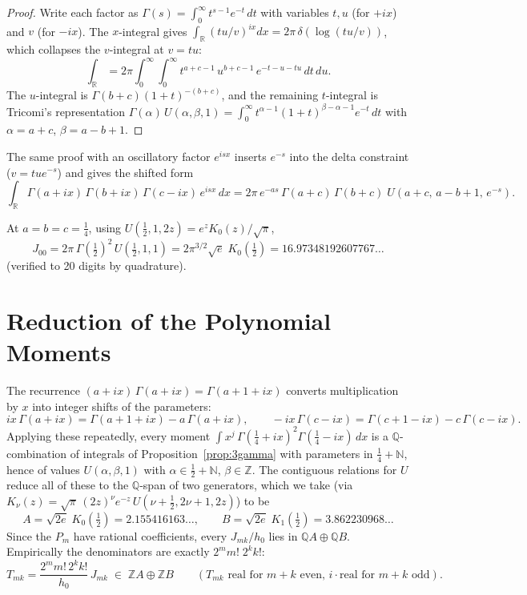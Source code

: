 \documentclass[11pt,a4paper]{article}
\newcommand{\R}{\mathbb{R}}
\newcommand{\Z}{\mathbb{Z}}
\newcommand{\Q}{\mathbb{Q}}
\begin{document}
\begin{proof}
Write each factor as $\Gamma(s) = \int_0^\infty t^{s-1} e^{-t}\, dt$
with variables $t, u$ (for $+ix$) and $v$ (for $-ix$). The $x$-integral
gives $\int_\R (tu/v)^{ix} dx = 2\pi\,\delta(\log(tu/v))$, which
collapses the $v$-integral at $v = tu$:
\[
  \int_\R
  = 2\pi \int_0^\infty\!\!\int_0^\infty
    t^{a+c-1}\, u^{b+c-1}\, e^{-t-u-tu}\, dt\, du.
\]
The $u$-integral is $\Gamma(b+c)(1+t)^{-(b+c)}$, and the remaining
$t$-integral is Tricomi's representation
$\Gamma(\alpha)\, U(\alpha, \beta, 1)
= \int_0^\infty t^{\alpha-1}(1+t)^{\beta-\alpha-1} e^{-t}\, dt$
with $\alpha = a+c$, $\beta = a-b+1$.
\end{proof}

The same proof with an oscillatory factor $e^{isx}$ inserts $e^{-s}$
into the delta constraint ($v = tu e^{-s}$) and gives the shifted form
\begin{equation}\label{eq:shifted}
  \int_\R \Gamma(a+ix)\,\Gamma(b+ix)\,\Gamma(c-ix)\, e^{isx}\, dx
  = 2\pi\, e^{-as}\, \Gamma(a+c)\,\Gamma(b+c)\;
    U(a+c,\, a-b+1,\, e^{-s}).
\end{equation}

At $a = b = c = \tfrac14$, using
$U(\tfrac12, 1, 2z) = e^{z} K_0(z)/\sqrt{\pi}$,
\begin{equation}\label{eq:base}
  J_{00} = 2\pi\, \Gamma(\tfrac12)^2\, U(\tfrac12, 1, 1)
  = 2\pi^{3/2} \sqrt{e}\; K_0(\tfrac12)
  = 16.97348192607767\ldots
\end{equation}
(verified to 20 digits by quadrature).

\section{Reduction of the Polynomial Moments}

The recurrence $(a+ix)\,\Gamma(a+ix) = \Gamma(a+1+ix)$ converts
multiplication by $x$ into integer shifts of the parameters:
\[
  ix\,\Gamma(a+ix) = \Gamma(a+1+ix) - a\,\Gamma(a+ix),
  \qquad
  -ix\,\Gamma(c-ix) = \Gamma(c+1-ix) - c\,\Gamma(c-ix).
\]
Applying these repeatedly, every moment
$\int x^j\, \Gamma(\tfrac14+ix)^2 \Gamma(\tfrac14-ix)\, dx$ is a
$\Q$-combination of integrals of Proposition~\ref{prop:3gamma} with parameters in
$\tfrac14 + \mathbb{N}$, hence of values $U(\alpha, \beta, 1)$ with
$\alpha \in \tfrac12 + \mathbb{N}$, $\beta \in \Z$. The contiguous
relations for $U$ reduce all of these to the $\Q$-span of two
generators, which we take (via
$K_\nu(z) = \sqrt{\pi}\,(2z)^\nu e^{-z}\, U(\nu+\tfrac12, 2\nu+1, 2z)$)
to be
\[
  A = \sqrt{2e}\; K_0(\tfrac12) = 2.155416163\ldots, \qquad
  B = \sqrt{2e}\; K_1(\tfrac12) = 3.862230968\ldots
\]
Since the $P_m$ have rational coefficients, every $J_{mk}/h_0$ lies in
$\Q A \oplus \Q B$. Empirically the denominators are exactly
$2^m m!\; 2^k k!$:
\begin{equation}\label{eq:T}
  T_{mk} = \frac{2^m m!\, 2^k k!}{h_0}\, J_{mk}
  \;\in\; \Z A \oplus \Z B
  \qquad (\text{$T_{mk}$ real for $m+k$ even, } i \cdot \text{real
  for $m+k$ odd}).
\end{equation}
\end{document}
